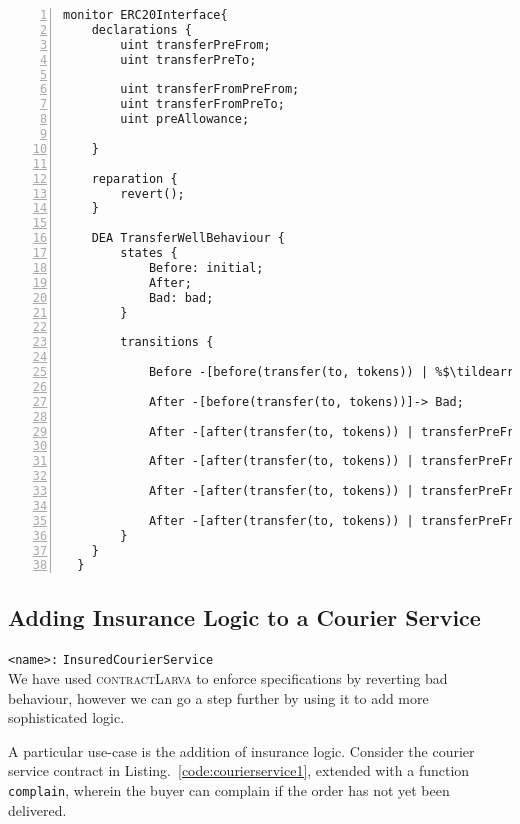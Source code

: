 \documentclass{article}
\newcommand{\contractlarva}{\textsc{contractLarva}\xspace}
\newcommand{\tildearrow}{{\raise.37ex\hbox{$\scriptstyle\mathtt{\sim}$}}\hspace{-0.08cm}>\xspace}
\begin{document}
      
  \small\begin{lstlisting}[language=DEA,basicstyle=\scriptsize,numbers=left,numbersep=2pt,xleftmargin=0.3cm,escapechar=\%,label={dea:erc20}]
  monitor ERC20Interface{
  	declarations {
  		uint transferPreFrom;
  		uint transferPreTo;
  
  		uint transferFromPreFrom;
  		uint transferFromPreTo;
  		uint preAllowance;
  
  	}
  
  	reparation {
  		revert();
  	}
  
  	DEA TransferWellBehaviour {
  		states {		
  			Before: initial;
  			After;
  			Bad: bad;
  		}
  		
  		transitions {
  		
  			Before -[before(transfer(to, tokens)) | %$\tildearrow$% {transferPreFrom = balanceOf(msg.sender); transferPreTo = balanceOf(to);}]-> After;	
  
  			After -[before(transfer(to, tokens))]-> Bad;
  			
  			After -[after(transfer(to, tokens)) | transferPreFrom < tokens && (balanceOf(msg.sender) != transferPreFrom || balanceOf(to) != transferPreTo)]-> Bad;
  
  			After -[after(transfer(to, tokens)) | transferPreFrom < tokens && (balanceOf(msg.sender) == transferPreFrom && balanceOf(to) == transferPreTo)]-> Before;
  
  			After -[after(transfer(to, tokens)) | transferPreFrom >= tokens && (balanceOf(msg.sender) != (transferPreFrom - tokens) || balanceOf(to) != (transferPreTo - tokens))]-> Bad;
  
  			After -[after(transfer(to, tokens)) | transferPreFrom >= tokens && (balanceOf(msg.sender) == (transferPreFrom - tokens) && balanceOf(to) == (transferPreTo - tokens))]-> Before;	
  		}
  	}
  }
      \end{lstlisting}\normalsize
 
 \subsection{Adding Insurance Logic to a Courier Service}
         \texttt{<name>:} \verb+InsuredCourierService+\\
         
 We have used \contractlarva to enforce specifications by reverting bad behaviour, however we can go a step further by using it to add more sophisticated logic. 
 
 A particular use-case is the addition of insurance logic. Consider the courier service contract in Listing.~\ref{code:courierservice1}, extended with a function \texttt{complain}, wherein the buyer can complain if the order has not yet been delivered.
 
\end{document}
